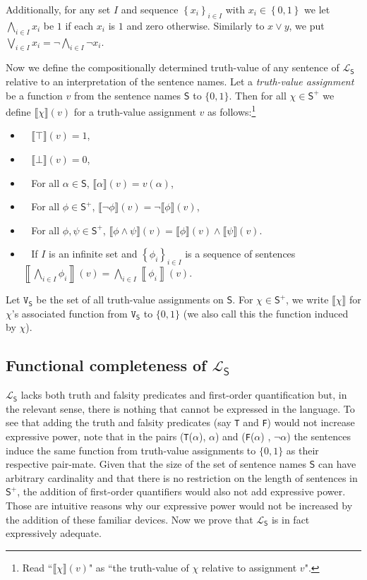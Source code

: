 \documentclass[12pt]{kluwer}
\theoremstyle{remark}
\newcommand{\fancy}[1]{\mathcal{#1}}
\def\S{\textsf{S}}
\def\V{\texttt{V}}
\def\L{\fancy{L}}
\newcommand{\eval}[2]{\left\llbracket #1 \right \rrbracket(#2)}
\newcommand{\set}[1]{\left\{ #1 \right\}}
\begin{document}
Additionally, for any set $I$ and sequence $\set{x_i}_{i \in I}$ with $x_i \in \set{0,1}$ we let $\bigwedge_{i \in I} x_i$ be $1$ if each $x_i$ is $1$ and zero otherwise.  Similarly to $x \vee y$, we put $\bigvee_{i \in I} x_i = \neg \bigwedge_{i \in I} \neg x_i$.

Now we define the compositionally determined truth-value of any sentence of $\L_\S$ relative to an interpretation of the sentence names. Let a \textit{truth-value assignment} be a function $v$ from the sentence names $\S$ to $\{0,1\}$. Then for all $\chi \in \S^{+}$ we define $\llbracket \chi\rrbracket(v)$ for a truth-value assignment $v$ as follows:\footnote{Read ``$\llbracket \chi\rrbracket(v)$" as ``the truth-value of $\chi$ relative to assignment $v$".}

\begin{itemize}

\item $\;\;$ $\llbracket \top \rrbracket(v) =1$,
\item $\;\;$ $\llbracket \bot \rrbracket(v) =0$,
\item $\;\;$ For all $\alpha\in\S$,  $\llbracket \alpha \rrbracket(v) = v(\alpha)$,
\item $\;\;$ For all $\phi\in\S^{+}$, $\llbracket \neg\phi \rrbracket(v) = \neg \llbracket \phi \rrbracket(v)$,
\item $\;\;$ For all $\phi, \psi \in\S^{+}$, $\llbracket \phi \wedge \psi \rrbracket(v) = \llbracket \phi \rrbracket(v) \wedge \llbracket \psi \rrbracket(v)$.
\item $\;\;$ If $I$ is an infinite set and $\set{\phi_i}_{i \in I}$ is a sequence of sentences $\eval{\bigwedge_{i \in I} \phi_i}{v} = \bigwedge_{i \in I} \eval{\phi_i}{v}$.
\end{itemize}

Let $\V_\S$ be the set of all truth-value assignments on $\S$. For $\chi \in \S^{+}$, we write $\llbracket \chi\rrbracket$ for $\chi$'s associated function from $\V_\S$ to $\{0,1\}$ (we also call this the function induced by $\chi$).  

\subsection{Functional completeness of $\L_\S$}
\label{functcom}
$\L_\S$ lacks both truth and falsity predicates and first-order quantification but, in the relevant sense, there is nothing that cannot be expressed in the language. To see that adding the truth and falsity predicates (say \texttt{T} and \texttt{F}) would not increase expressive power, note that in the pairs (\texttt{T}($\alpha$), $\alpha$) and  (\texttt{F}($\alpha$) , $\neg \alpha$) the sentences induce the same function from truth-value assignments to $\{0,1\}$ as their respective pair-mate. Given that the size of the set of sentence names $\S$ can have arbitrary cardinality and that there is no restriction on the length of sentences in $\S^{+}$, the addition of first-order quantifiers would also not add expressive power. Those are intuitive reasons why our expressive power would not be increased by the addition of these familiar devices. Now we prove that $\L_\S$ is in fact expressively adequate.
\end{document}
